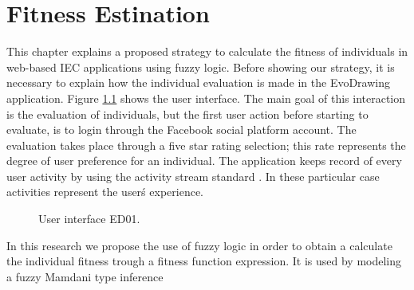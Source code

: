 \chapter{Fitness Estination}

This chapter explains a proposed strategy to calculate the fitness of
individuals in web-based IEC applications
using fuzzy logic. Before showing our strategy, it is necessary to explain how
the individual evaluation is made in the EvoDrawing application. Figure
\ref{fig:UI_ED} shows the user interface.
The main goal of this interaction is the evaluation of individuals, but
the first user action before starting to evaluate, is to login through the
Facebook \cite{facebook} social
platform account. The evaluation takes place through a
five star rating selection; this rate represents the degree of user
preference for an individual. The application keeps record of every user
activity by using the activity stream standard \cite{snell2014json}. %
In these particular case activities represent the user\'s experience.

\begin{figure}
\captionsetup{justification=centering,margin=2cm}
\centering
\setlength\fboxsep{0pt}
\setlength\fboxrule{0.7pt}
\caption{User interface ED01.}
\label{fig:UI_ED}
\end{figure}

In this research we propose the use of fuzzy logic \cite{Zadeh1973} in order to
obtain a %
calculate the individual fitness trough a fitness function expression. It is
used by modeling a fuzzy Mamdani type inference

